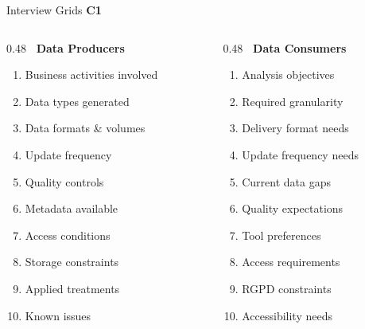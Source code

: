 \documentclass[aspectratio=169, 10pt]{beamer}
\newcommand{\competency}[1]{\textbf{\color{ntblue}#1}}
\begin{document}
\begin{frame}{Interview Grids \competency{C1}}
\begin{columns}[T]
\begin{column}{0.48\textwidth}
  \textbf{\faUsers\ Data Producers}
  \begin{enumerate}\small
    \item Business activities involved
    \item Data types generated
    \item Data formats \& volumes
    \item Update frequency
    \item Quality controls
    \item Metadata available
    \item Access conditions
    \item Storage constraints
    \item Applied treatments
    \item Known issues
  \end{enumerate}
\end{column}
\begin{column}{0.48\textwidth}
  \textbf{\faChartBar\ Data Consumers}
  \begin{enumerate}\small
    \item Analysis objectives
    \item Required granularity
    \item Delivery format needs
    \item Update frequency needs
    \item Current data gaps
    \item Quality expectations
    \item Tool preferences
    \item Access requirements
    \item RGPD constraints
    \item Accessibility needs
  \end{enumerate}
\end{column}
\end{columns}

\end{frame}
\end{document}
